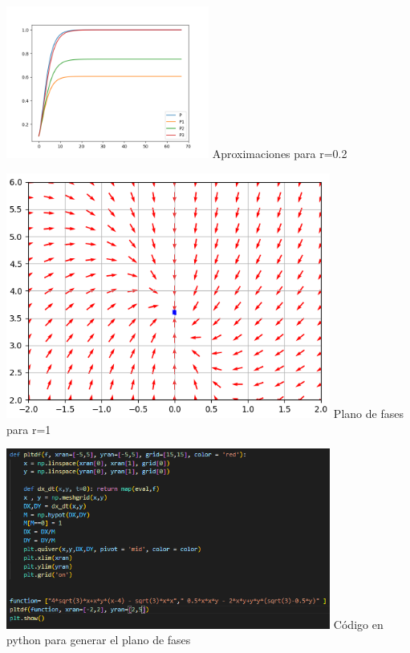 \documentclass[a4 paper, 12pt]{article}
\begin{document}
\begin{center}
\includegraphics[width=0.5\textwidth]{r=0.2}
 {Aproximaciones para r=0.2} \label{aprox2}

\includegraphics[width=0.8\textwidth]{fase lamba1}
 {Plano de fases para r=1} \label{plano}

\includegraphics[width=0.8\textwidth]{codigofase}
 {C\'odigo en python para generar el plano de fases} \label{codigofase}
\end{center}
\end{document}
